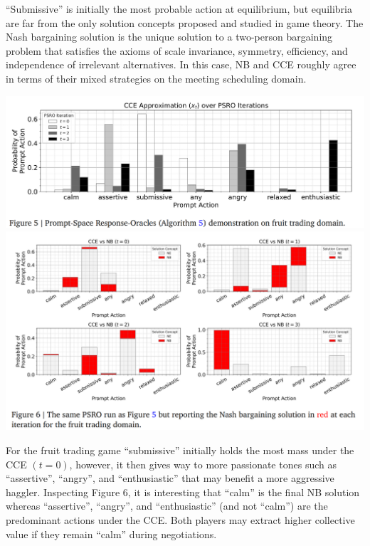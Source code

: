 \documentclass[12pt]{article}
\begin{document}
\begin{itemize}
\begin{center}
  \end{center}
  ``Submissive'' is initially the most probable action at equilibrium, but equilibria are far from the only solution concepts proposed and studied in game theory. The Nash bargaining solution is the unique
  solution to a two-person bargaining problem that satisfies the axioms of scale invariance, symmetry,
  efficiency, and independence of irrelevant alternatives. In this case, NB and CCE
  roughly agree in terms of their mixed strategies on the meeting scheduling domain.
  \begin{center}
    \includegraphics*[scale = 0.5]{table11.png}
    \includegraphics*[scale = 0.5]{table12.png}
  \end{center}
\end{itemize}
For the fruit trading game ``submissive'' initially holds the most mass under the CCE $(t = 0)$, however, it then gives way to more
passionate tones such as ``assertive'', ``angry'', and ``enthusiastic'' that may benefit a more aggressive
haggler. Inspecting Figure 6, it is interesting that ``calm'' is the final NB solution whereas ``assertive'',
``angry'', and ``enthusiastic'' (and not ``calm'') are the predominant actions under the CCE. Both players
may extract higher collective value if they remain ``calm'' during negotiations.
\end{document}
